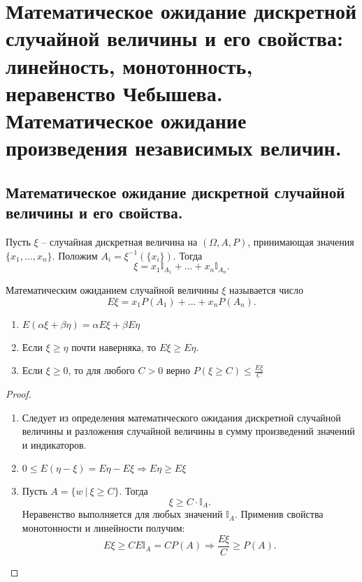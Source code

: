 \section{Математическое ожидание дискретной случайной величины и его свойства: линейность, монотонность, неравенство Чебышева. Математическое ожидание произведения независимых величин.}

\subsection{Математическое ожидание дискретной случайной величины и его свойства.}
Пусть $\xi$ -- случайная дискретная величина на $(\Omega, A, P)$, принимающая значения $\{x_1, ..., x_n\}$. Положим $A_i = \xi^{-1}(\{x_i\})$. Тогда
\[
    \xi = x_1 \mathbb{I}_{A_1} + ... + x_n \mathbb{I}_{A_n}.
\]
\begin{definition}
    Математическим ожиданием случайной величины $\xi$ называется число
    \[
        E \xi = x_1 P(A_1) + ... + x_n P(A_n).
    \]
\end{definition}

\begin{theorem}
    \text{}
    \begin{enumerate}
        \item $E( \alpha \xi + \beta \eta ) = \alpha E \xi + \beta E \eta$
        \item Если $\xi \geqslant \eta$ почти наверняка, то $E \xi \geqslant E \eta$.
        \item Если $\xi \geqslant 0$, то для любого $C > 0$ верно $P(\xi \geqslant C) \leqslant \frac{E \xi}{C}$
    \end{enumerate}
    \begin{proof}
        \text{}
        \begin{enumerate}
            \item Следует из определения математического ожидания дискретной случайной величины и разложения случайной величины в сумму произведений значений и индикаторов.
            \item $0 \leqslant E(\eta - \xi) = E\eta - E \xi \Rightarrow E\eta \geqslant E \xi$
            \item Пусть $A = \{ w \> | \> \xi \geqslant C \}$. Тогда
            \[
                \xi \geqslant C \cdot \mathbb{I}_A.
            \] Неравенство выполняется для любых значений $\mathbb{I}_A$. Применив свойства монотонности и линейности получим:
            \[
                E \xi \geqslant C E \mathbb{I}_A = C P(A) \Rightarrow \frac{E \xi}{C} \geqslant P(A).
            \]
        \end{enumerate}
    \end{proof}
\end{theorem}


